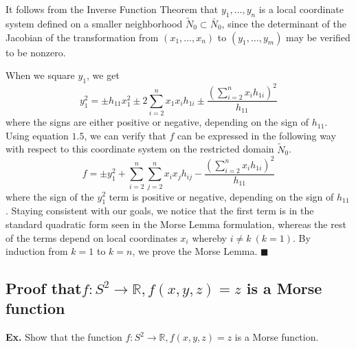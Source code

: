 \documentclass[]{article}
\newcommand{\R}{\mathbb{R}}
\begin{document}
     It follows from the Inverse Function Theorem that $y_1,\ldots,y_n$ is a local
     coordinate system defined on a smaller neighborhood $\tilde{N}_0 \subset \bar{N}_0$,
     since the determinant of the Jacobian of the transformation from $(x_1, \ldots,x_n)$
     to $(y_1,\ldots,y_m)$ may be verified to be nonzero.

     When we square $y_1$, we get
     \begin{equation}
        y_1^2=\pm h_{11}x_1^2\pm2\sum_{i=2}^{n}{x_1x_ih_{1i}}\pm\frac{\left(\sum_{i=2}^{n}{x_ih_{1i}}\right)^2}{h_{11}}\tag{1.9}
     \end{equation}
     where the signs are either positive or negative, depending on the sign of $h_{11}$. Using equation
     $1.5$, we can verify that $f$ can be expressed in the following way with respect to this
     coordinate system on the restricted domain $\tilde{N}_0$.
     \begin{equation}
        f=\pm y_1^2 + \sum_{i=2}^{n}\sum_{j=2}^{n}{x_ix_jh_{ij}}-\frac{\left(\sum_{i=2}^{n}{x_ih_{1i}}\right)^2}{h_{11}}\tag{1.10}
     \end{equation}
     where the sign of the $y_1^2$ term is positive or negative, depending on the sign of $h_{11}$. Staying
     consistent with our goals, we notice that the first term is in the standard quadratic form seen
     in the Morse Lemma formulation, whereas the rest of the terms depend on local coordinates
     $x_i$ whereby $i\not=k \ (k=1)$. By induction from $k=1$ to $k=n$, we prove the Morse Lemma. $\blacksquare$

\subsection{Proof that$f: S^2 \to \R, f(x,y,z) = z$ is a Morse function}
\textbf{Ex.} Show that the function $f: S^2 \to \R, f(x,y,z) = z$ is a Morse function. \\
\end{document}
